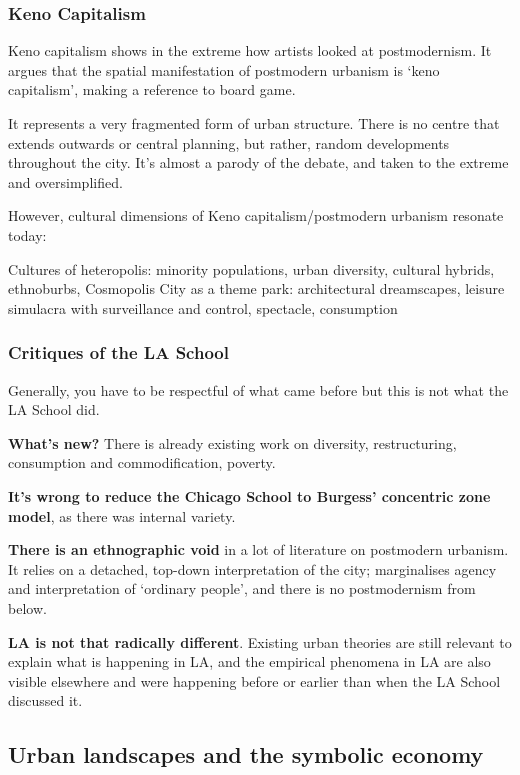\documentclass{article}
\begin{document}
\subsubsection{Keno Capitalism}

Keno capitalism shows in the extreme how artists looked at postmodernism. It argues that the spatial manifestation of postmodern urbanism is `keno capitalism', making a reference to board game.

It represents a very fragmented form of urban structure. There is no centre that extends outwards or central planning, but rather, random developments throughout the city. It's almost a parody of the debate, and taken to the extreme and oversimplified.

However, cultural dimensions of Keno capitalism/postmodern urbanism resonate today:

\begin{outline}
	\1 Cultures of heteropolis: minority populations, urban diversity, cultural hybrids, ethnoburbs, Cosmopolis
	\1 City as a theme park: architectural dreamscapes, leisure simulacra with surveillance and control, spectacle, consumption
\end{outline}

\subsubsection{Critiques of the LA School}

Generally, you have to be respectful of what came before but this is not what the LA School did.

\textbf{What's new?} There is already existing work on diversity, restructuring, consumption and commodification, poverty.

\textbf{It's wrong to reduce the Chicago School to Burgess' concentric zone model}, as there was internal variety.

\textbf{There is an ethnographic void} in a lot of literature on postmodern urbanism. It relies on a detached, top-down interpretation of the city; marginalises agency and interpretation of `ordinary people', and there is no postmodernism from below.

\textbf{LA is not that radically different}. Existing urban theories are still relevant to explain what is happening in LA, and the empirical phenomena in LA are also visible elsewhere and were happening before or earlier than when the LA School discussed it.

\subsection{Urban landscapes and the symbolic economy}
\end{document}
